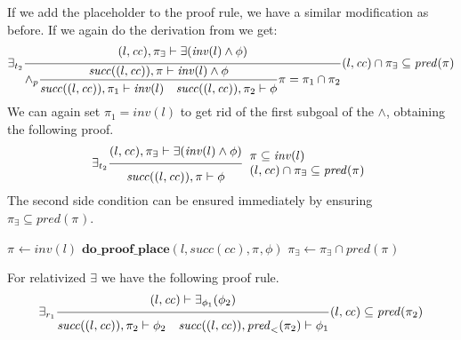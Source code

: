 \documentclass{article}
\newcommand{\proofrule}[3][]{#1 \frac{\raisebox{.7ex}{\normalsize{$#2$}}}
  {\raisebox{-1.0ex}{\normalsize{$#3$}}}}
\newcommand{\placeholder}[1][]{\pi_{#1}}
\newcommand{\loc}{l}
\newcommand{\region}{\mathit{cc}}
\newcommand{\suc}{\mathit{succ}}
\newcommand{\pre}{\mathit{pred}}
\newcommand{\inv}{\mathit{inv}}
\newcommand{\method}[1]{\ensuremath{\mathbf{#1}}}
\begin{document}
If we add the placeholder to the proof rule, we have a similar modification as
before. If we again do the derivation from \cite[Appendix C.2]{FC:14report} we get:
\[
\proofrule[\exists_{t_2}]
{(\loc, \region), \placeholder[\exists] \vdash \exists(\inv(\loc) \land \phi)}
{\proofrule[\land_p]
  {\suc((\loc, \region)), \placeholder \vdash \inv(\loc) \land \phi}
  {\suc((\loc, \region)), \placeholder[1] \vdash \inv(\loc)
   \quad \suc((\loc, \region)), \placeholder[2] \vdash \phi}
  \placeholder = \placeholder[1] \cap \placeholder[2]
}
(\loc, \region) \cap \placeholder[\exists] \subseteq \pre(\placeholder)
\]
We can again set $\placeholder[1] = \inv(\loc)$ to get rid of the first subgoal of the $\land$,
obtaining the following proof.
\[
\proofrule[\exists_{t_2}]
{(\loc, \region), \placeholder[\exists] \vdash \exists(\inv(\loc) \land \phi)}
{\suc((\loc, \region)), \placeholder \vdash \phi}
\begin{array}{l}
\placeholder \subseteq \inv(l)\\
(\loc, \region) \cap \placeholder[\exists] \subseteq \pre(\placeholder)
\end{array}
\]
The second side condition can be ensured immediately by ensuring $\placeholder[\exists] \subseteq \pre(\placeholder)$.

\begin{algorithm}[H]
\caption{$\method{do\_proof\_exists\_place}(\loc, \region, \placeholder[\exists], \exists(\phi))$}
\begin{algorithmic}
\STATE $\placeholder \gets \inv(\loc)$ 
\STATE $\method{do\_proof\_place}(\loc, \suc(\region), \placeholder, \phi)$
\STATE $\placeholder[\exists] \gets \placeholder[\exists] \cap \pre(\placeholder)$
\end{algorithmic}
\end{algorithm}


For relativized $\exists$ we have the following proof rule.
\[
\proofrule[\exists_{r_1}]
{(\loc, \region) \vdash \exists_{\phi_1}(\phi_2)}
{\suc((\loc,\region)), \placeholder[2] \vdash \phi_2
\quad
\suc((\loc, \region)), \pre_{<}(\placeholder[2]) \vdash \phi_1
}
(\loc, \region) \subseteq \pre(\placeholder[2])
\]
\end{document}
